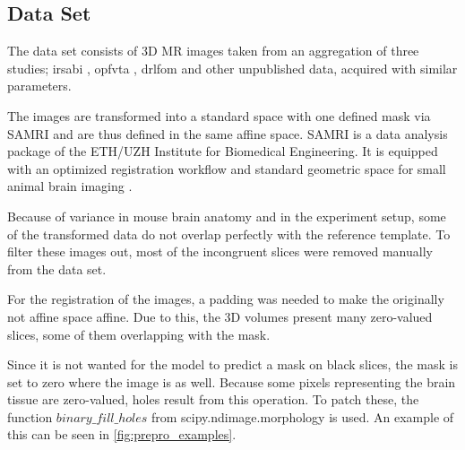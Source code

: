 \subsection{Data Set} \label{subsec:Data Set}
The data set consists of 3D MR images taken from an aggregation of three studies; irsabi , opfvta \cite{ioanas_whole-brain_nodate}, drlfom \cite{ioanas_effects_nodate} and other unpublished data, acquired with similar parameters.

The images are transformed into a standard space with one defined mask via SAMRI \cite{noauthor_ibt-fmi/samri_2019} and are thus defined in the same affine space.
SAMRI is a data analysis package of the ETH/UZH Institute for Biomedical Engineering.
It is equipped with an optimized registration workflow and standard geometric space for small animal brain imaging \cite{ioanas_optimized_2019}.

Because of variance in mouse brain anatomy and in the experiment setup, some of the transformed data do not overlap perfectly with the reference template.
To filter these images out, most of the incongruent slices were removed manually from the data set.

For the registration of the images, a padding was needed to make the originally not affine space affine. 
Due to this, the 3D volumes present many zero-valued slices, some of them overlapping with the mask.

Since it is not wanted for the model to predict a mask on black slices, the mask is set to zero where the image is as well.
Because some pixels representing the brain tissue are zero-valued, holes result from this operation.
To patch these, the function \textcolor{mg}{\texttt{$binary\_fill\_holes$}} from scipy.ndimage.morphology \cite{noauthor_multi-dimensional_nodate} is used.
An example of this can be seen in \cref{fig:prepro_examples}.

